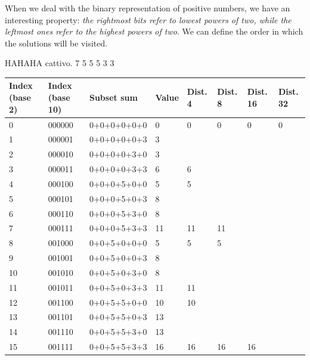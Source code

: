 \documentclass[12pt]{extarticle}
\begin{document}
When we deal with the binary representation of positive numbers, we have an interesting property: \emph{the rightmost bits refer to lowest powers of two, while the leftmost ones refer to the highest powers of two}.
We can define the order in which the solutions will be visited.\newline


HAHAHA cattivo. 7 5 5 5 3 3 

\begin{center}
\begin{tabular}{ | m{1.5cm} | m{1.7cm} | m{3cm} | m{1.2cm} | m{1.3cm} | m{1.3cm} | m{1.5cm} | m{1.5cm} |}
 \hline
 Index (base 2) & Index (base 10) & Subset sum & Value & Dist. 4 & Dist. 8 & Dist. 16 & Dist. 32\\
 \hline
 0 & 000000 & 0+0+0+0+0+0 & 0 & 0                  & 0                     & 0                   & 0\\
 \cline{1-4}
 1 & 000001 & 0+0+0+0+0+3 & 3 & \multirow{2}{*}{ } & \multirow{6}{*}{ }    & \multirow{14}{*}{}  & \multirow{30}{*}{}\\
 \cline{1-4}
 2 & 000010 & 0+0+0+0+3+0 & 3 &                    &                       &                     &\\
 \cline{1-4}
 3 & 000011 & 0+0+0+0+3+3 & 6 &                  6 &                       &                     &\\
 \cline{1-5}
 4 & 000100 & 0+0+0+5+0+0 & 5 &                  5 &                       &                     &\\
 \cline{1-4}
 5 & 000101 & 0+0+0+5+0+3 & 8 & \multirow{2}{*}{ } &                       &                     &\\
 \cline{1-4}
 6 & 000110 & 0+0+0+5+3+0 & 8 &                    &                       &                     &\\
 \cline{1-4}
 7 & 000111 & 0+0+0+5+3+3 & 11 &                11 & 11                    &                     &\\
 \cline{1-6}

 8 & 001000 & 0+0+5+0+0+0 & 5 & 5                  & 5                     &                     &\\
 \cline{1-4}
 9 & 001001 & 0+0+5+0+0+3 & 8 & \multirow{2}{*}{ } & \multirow{6}{*}{ }    &                     &\\
 \cline{1-4}
 10 & 001010 & 0+0+5+0+3+0 & 8 &                   &                       &                     &\\
 \cline{1-4}
 11 & 001011 & 0+0+5+0+3+3 & 11 &               11 &                       &                     &\\
 \cline{1-5}
 12 & 001100 & 0+0+5+5+0+0 & 10 &               10 &                       &                     &\\
 \cline{1-4}
 13 & 001101 & 0+0+5+5+0+3 & 13 & \multirow{2}{*}{ } &                     &                     &\\
 \cline{1-4}
 14 & 001110 & 0+0+5+5+3+0 & 13 &                    &                     &                     &\\
 \cline{1-4}
 15 & 001111 & 0+0+5+5+3+3 & 16 &                 16 & 16                  & 16                  &\\
 \cline{1-7}


\end{tabular}
\end{center}
\end{document}
